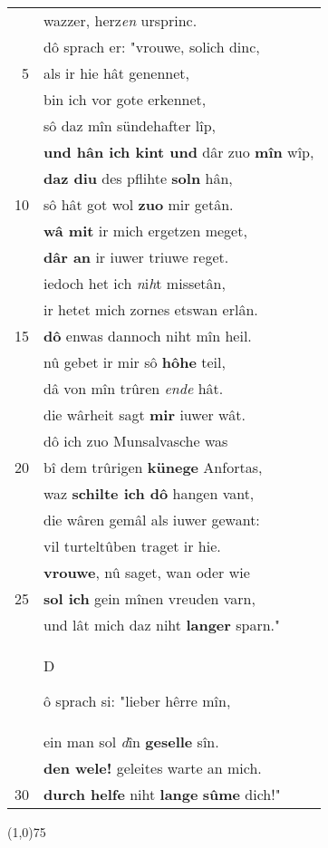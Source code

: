\documentclass[8pt,a4paper,notitlepage]{article}
\begin{document}
\begin{table}[ht]
\begin{minipage}[t]{0.5\linewidth}
\begin{tabular}{rl}
 & wazzer, herz\textit{en} ursprinc.\\ 
 & dô sprach er: "vrouwe, solich dinc,\\ 
5 & als ir hie hât genennet,\\ 
 & bin ich vor gote erkennet,\\ 
 & sô daz mîn sündehafter lîp,\\ 
 & \textbf{und hân ich kint und} dâr zuo \textbf{mîn} wîp,\\ 
 & \textbf{daz diu} des pflihte \textbf{soln} hân,\\ 
10 & sô hât got wol \textbf{zuo} mir getân.\\ 
 & \textbf{wâ mit} ir mich ergetzen meget,\\ 
 & \textbf{dâr an} ir iuwer triuwe reget.\\ 
 & iedoch het ich \textit{n}i\textit{h}t missetân,\\ 
 & ir hetet mich zornes etswan erlân.\\ 
15 & \textbf{dô} enwas dannoch niht mîn heil.\\ 
 & nû gebet ir mir sô \textbf{hôhe} teil,\\ 
 & dâ von mîn trûren \textit{ende} hât.\\ 
 & die wârheit sagt \textbf{mir} iuwer wât.\\ 
 & dô ich zuo Munsalvasche was\\ 
20 & bî dem trûrigen \textbf{künege} Anfortas,\\ 
 & waz \textbf{schilte ich dô} hangen vant,\\ 
 & die wâren gemâl als iuwer gewant:\\ 
 & vil turteltûben traget ir hie.\\ 
 & \textbf{vrouwe}, nû saget, wan oder wie\\ 
25 & \textbf{sol ich} gein mînen vreuden varn,\\ 
 & und lât mich daz niht \textbf{langer} sparn."\\ 
 & \begin{large}D\end{large}ô sprach si: "lieber hêrre mîn,\\ 
 & ein man sol \textit{d}în \textbf{geselle} sîn.\\ 
 & \textbf{den wele!} geleites warte an mich.\\ 
30 & \textbf{durch helfe} niht \textbf{lange} \textbf{sûme} dich!"\\ 
\end{tabular}
\scriptsize
\line(1,0){75} \newline

\end{minipage}
\end{table}
\end{document}

